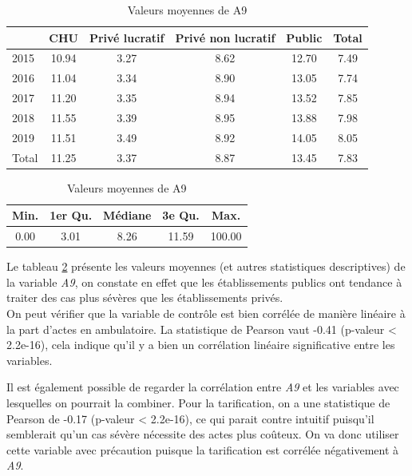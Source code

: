 \bigskip

\begin{table}[ht]
\centering
\caption{Valeurs moyennes de A9} 
\label{A9_des}
\begin{tabular}{l|cccc|c}
  \hline
 & CHU & Privé lucratif & Privé non lucratif & Public & Total \\ 
  \hline
2015 & 10.94 & 3.27 & 8.62 & 12.70 & 7.49 \\ 
  2016 & 11.04 & 3.34 & 8.90 & 13.05 & 7.74 \\ 
  2017 & 11.20 & 3.35 & 8.94 & 13.52 & 7.85 \\ 
  2018 & 11.55 & 3.39 & 8.95 & 13.88 & 7.98 \\ 
  2019 & 11.51 & 3.49 & 8.92 & 14.05 & 8.05 \\ 
  \hline
  Total & 11.25 & 3.37 & 8.87 & 13.45 & 7.83 \\ 
   \hline
\end{tabular}

\bigskip

\begin{tabular}{ccccc}
  \hline
Min. & 1er Qu. & Médiane & 3e Qu. & Max. \\ 
  \hline
0.00 & 3.01 & 8.26 & 11.59 & 100.00 \\ 
   \hline
\end{tabular}

\end{table}

\bigskip

Le tableau \ref{A9_des} présente les valeurs moyennes (et autres statistiques descriptives) de la variable \textit{A9}, on constate en effet que les établissements publics ont tendance à traiter des cas plus sévères que les établissements privés.\\

On peut vérifier que la variable de contrôle est bien corrélée de manière linéaire à la part d'actes en ambulatoire. La statistique de Pearson vaut -0.41 (p-valeur < 2.2e-16), cela indique qu'il y a bien un corrélation linéaire significative entre les variables.

Il est également possible de regarder la corrélation entre \textit{A9} et les variables avec lesquelles on pourrait la combiner. Pour la tarification, on a une statistique de Pearson de -0.17 (p-valeur < 2.2e-16), ce qui parait contre intuitif puisqu'il semblerait qu'un cas sévère nécessite des actes plus coûteux.
On va donc utiliser cette variable avec précaution puisque la tarification est corrélée négativement à \textit{A9}.\\



